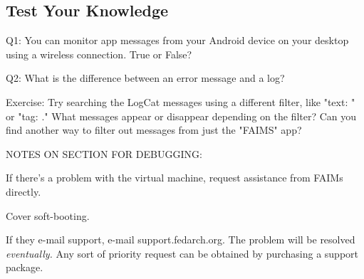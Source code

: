 {}

\subsection[section-9]{}

\subsection[test-your-knowledge-3]{Test Your Knowledge}

Q1: You can monitor app messages from your Android device on your desktop using a wireless connection. True or False?

Q2: What is the difference between an error message and a log?

Exercise: Try searching the LogCat messages using a different filter, like "text: " or "tag: ." What messages appear or disappear depending on the filter? Can you find another way to filter out messages from just the "FAIMS" app?


NOTES ON SECTION FOR DEBUGGING:

If there's a problem with the virtual machine, request assistance from FAIMs directly.

Cover soft-booting.

If they e-mail support, e-mail support.fedarch.org. The problem will be resolved {\em eventually.} Any sort of priority request can be obtained by purchasing a support package.
